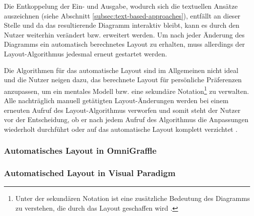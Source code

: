 Die Entkoppelung der Ein- und Ausgabe, wodurch sich die textuellen Ansätze auszeichnen (siehe Abschnitt \ref{subsec:text-based-approaches}), entfällt an dieser Stelle und da das resultierende Diagramm interaktiv bleibt, kann es durch den Nutzer weiterhin verändert bzw. erweitert werden. Um nach jeder Änderung des Diagramms ein automatisch berechnetes Layout zu erhalten, muss allerdings der Layout-Algorithmus jedesmal erneut gestartet werden.

Die Algorithmen für das automatische Layout sind im Allgemeinen nicht ideal und die Nutzer neigen dazu, das berechnete Layout für persönliche Präferenzen anzupassen, um ein mentales Modell bzw. eine sekundäre Notation\footnote{Unter der sekundären Notation ist eine zusätzliche Bedeutung des Diagramms zu verstehen, die durch das Layout geschaffen wird \cite{SeyboldGlinz03An-Effective}.} zu verwalten. Alle nachträglich manuell getätigten Layout-Änderungen werden bei einem erneuten Aufruf des Layout-Algorithmus verworfen und somit steht der Nutzer vor der Entscheidung, ob er nach jedem Aufruf des Algorithmus die Anpassungen wiederholt durchführt oder auf das automatische Layout komplett verzichtet \cite[S.119ff]{Eiglsperger04Automatic}.

\subsubsection{Automatisches Layout in OmniGraffle}
\label{subsubsec:omnigraffle-auto-layout}




\subsubsection{Automatisched Layout in Visual Paradigm}



